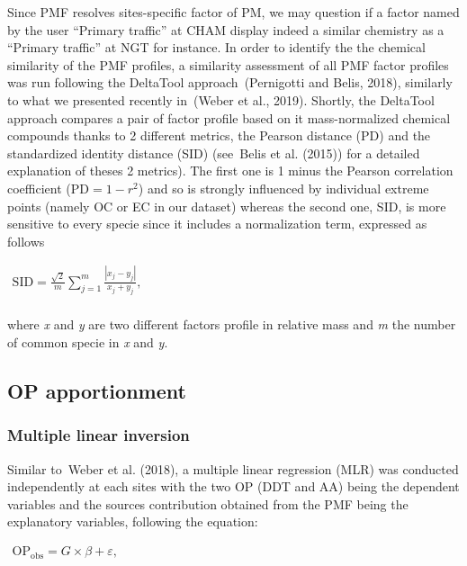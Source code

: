 \documentclass[
]{article}
\begin{document}
Since PMF resolves sites-specific factor of PM, we may question if a
factor named by the user ``Primary traffic'' at CHAM display indeed a
similar chemistry as a ``Primary traffic'' at NGT for instance. In order
to identify the the chemical similarity of the PMF profiles, a
similarity assessment of all PMF factor profiles was run following the
DeltaTool approach~(Pernigotti and Belis, 2018), similarly to what we
presented recently in~(Weber et al., 2019). Shortly, the DeltaTool
approach compares a pair of factor profile based on it mass-normalized
chemical compounds thanks to 2 different metrics, the Pearson distance
(PD) and the standardized identity distance (SID) (see~Belis et al.
(2015)) for a detailed explanation of theses 2 metrics). The first one
is 1 minus the Pearson correlation coefficient
(\(\text{PD} = 1 - r^{2}\)) and so is strongly influenced by individual
extreme points (namely OC or EC in our dataset) whereas the second one,
SID, is more sensitive to every specie since it includes a normalization
term, expressed as follows

\(\begin{matrix}
\text{SID} = \frac{\sqrt{2}}{m}\sum_{j = 1}^{m}\frac{\left| x_{j} - y_{j} \right|}{x_{j} + y_{j}}, \\
\end{matrix}\)

where \emph{x} and \emph{y} are two different factors profile in
relative mass and \emph{m} the number of common specie in \emph{x} and
\emph{y}.

\hypertarget{op-apportionment}{%
\subsection{OP apportionment}\label{op-apportionment}}

\hypertarget{multiple-linear-inversion}{%
\subsubsection{Multiple linear
inversion}\label{multiple-linear-inversion}}

Similar to~Weber et al. (2018), a multiple linear regression (MLR) was
conducted independently at each sites with the two OP (DDT and AA) being
the dependent variables and the sources contribution obtained from the
PMF being the explanatory variables, following the equation:

\(\begin{matrix}
\text{OP}_{\text{obs}} = G \times \beta + \varepsilon, \\
\end{matrix}\)
\end{document}
